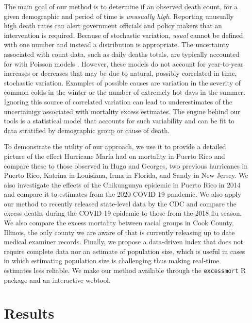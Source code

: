 \documentclass[11pt]{article}
\begin{document}
The main goal of our method is to determine if an observed death count, for a given demographic and period of time is \textit{unusually high}. Reporting unusually high death rates can alert government officials and policy makers that an intervention is required. Because of stochastic variation, \textit{usual} cannot be defined with one number and instead a distribution is appropriate. The uncertainty associated with count data, such as daily deaths totals, are typically accounted for with Poisson models \cite{mccullagh19831989, agresti2015foundations}. However, these models do not account for year-to-year increases or decreases that may be due to natural, possibly correlated in time, stochastic variation. Examples of possible causes are variation in the severity of common colds in the winter or the number of extremely hot days in the summer. Ignoring this source of correlated variation can lead to underestimates of the uncertainigy associated with mortality excess estimates. The engine behind our tools is a statistical model that accounts for such variability and can be fit to data stratified by demographic group or cause of death. 

To demonstrate the utility of our approach, we use it to provide a detailed picture of the effect Hurricane Mar\'ia had on mortality in Puerto Rico and compare these to those observed in Hugo and Georges, two previous hurricanes in Puerto Rico, Katrina in Louisiana, Irma in Florida, and Sandy in New Jersey. We also investigate the effects of the Chikungunya epidemic in Puerto Rico in 2014 and compare it to estimates from the 2020 COVID-19 pandemic. We also apply our method to recently released state-level data by the CDC and compare the excess deaths during the COVID-19 epidemic to those from the 2018 flu season. We also compare the excess mortality between racial groups in Cook County, Illinois, the only county we are aware of that is currently releasing up to date medical examiner records. Finally, we propose a data-driven index that does not require complete data nor an estimate of population size, which is useful in cases in which estimating population size is challenging thus making real-time estimates less reliable. We make our method available through the \verb+excessmort+ R package and an interactive webtool. \\

\section{Results}
\label{sec:results}
\end{document}
